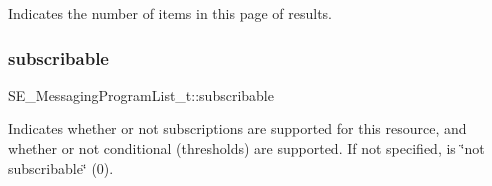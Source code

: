 Indicates the number of items in this page of results. \mbox{\label{group__MessagingProgramList_gaa0e2fbe57fd90cc867bac24472c1d8df}} 
\subsubsection{\texorpdfstring{subscribable}{subscribable}}
{\footnotesize\ttfamily S\+E\+\_\+\+Messaging\+Program\+List\+\_\+t\+::subscribable}

Indicates whether or not subscriptions are supported for this resource, and whether or not conditional (thresholds) are supported. If not specified, is \char`\"{}not subscribable\char`\"{} (0). 